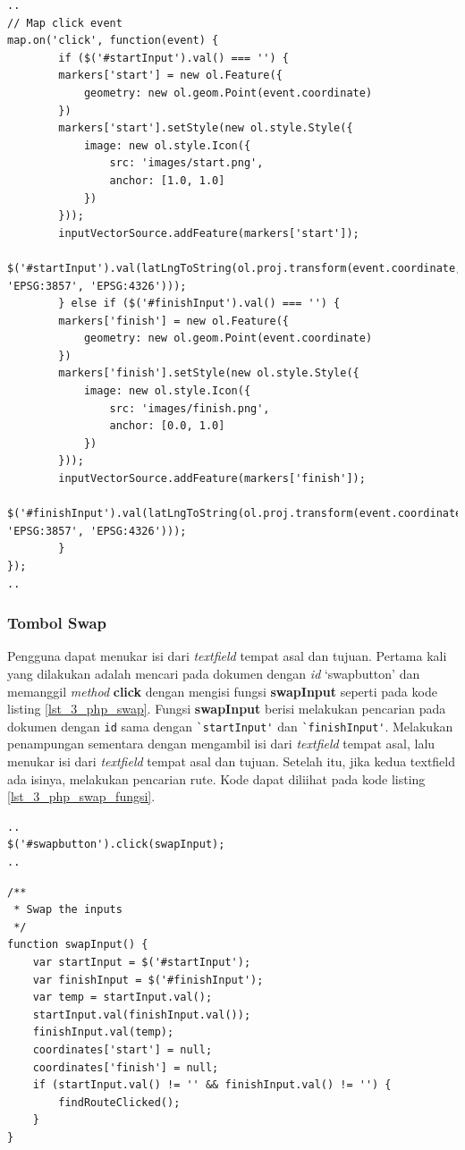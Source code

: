 \begin{enumerate}
	\begin{lstlisting}[caption=Membuat \textit{event} klik pada peta,label = {lst_3_php_textfield_koord_kode}]
..
// Map click event
map.on('click', function(event) {
    	if ($('#startInput').val() === '') {
		markers['start'] = new ol.Feature({
			geometry: new ol.geom.Point(event.coordinate)
		})
		markers['start'].setStyle(new ol.style.Style({
			image: new ol.style.Icon({
				src: 'images/start.png',
				anchor: [1.0, 1.0]
			})
		}));
		inputVectorSource.addFeature(markers['start']);
    		$('#startInput').val(latLngToString(ol.proj.transform(event.coordinate, 'EPSG:3857', 'EPSG:4326')));
    	} else if ($('#finishInput').val() === '') {
		markers['finish'] = new ol.Feature({
			geometry: new ol.geom.Point(event.coordinate)
		})
		markers['finish'].setStyle(new ol.style.Style({
			image: new ol.style.Icon({
				src: 'images/finish.png',
				anchor: [0.0, 1.0]
			})
		}));
		inputVectorSource.addFeature(markers['finish']);
    		$('#finishInput').val(latLngToString(ol.proj.transform(event.coordinate, 'EPSG:3857', 'EPSG:4326')));
    	}
});
..
\end{lstlisting}

\end{enumerate}

\subsubsection{Tombol Swap}
Pengguna dapat menukar isi dari \textit{textfield} tempat asal dan tujuan. Pertama kali yang dilakukan adalah mencari pada dokumen dengan \textit{id} `swapbutton' dan memanggil \textit{method} \textbf{click} dengan mengisi fungsi \textbf{swapInput} seperti pada kode listing \ref{lst_3_php_swap}. Fungsi \textbf{swapInput} berisi melakukan pencarian pada dokumen dengan \verb!id! sama dengan \verb!`startInput'! dan \verb!`finishInput'!. Melakukan penampungan sementara dengan mengambil isi dari \textit{textfield} tempat asal, lalu menukar isi dari \textit{textfield} tempat asal dan tujuan. Setelah itu, jika kedua textfield ada isinya, melakukan pencarian rute. Kode dapat diliihat pada kode listing \ref{lst_3_php_swap_fungsi}.

\begin{lstlisting}[caption=\textit{Method} untuk memanggil fungsi JavaScript ketika tombol \textit{swap} ditekan ,label = {lst_3_php_swap}]
..
$('#swapbutton').click(swapInput);
..
\end{lstlisting}

\begin{lstlisting}[caption=Fungsi JavaScript untuk menukar isi \textit{textfield} tempat asal dan tujuan ,label = {lst_3_php_swap_fungsi}]	
/**
 * Swap the inputs
 */
function swapInput() {
	var startInput = $('#startInput');
	var finishInput = $('#finishInput');
	var temp = startInput.val();
	startInput.val(finishInput.val());
	finishInput.val(temp);
	coordinates['start'] = null;
	coordinates['finish'] = null;
	if (startInput.val() != '' && finishInput.val() != '') {
		findRouteClicked();
	}
}
\end{lstlisting}

